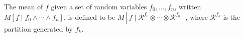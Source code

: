 The mean of $f$ given a set of random variables $f_0, \ldots, f_n$, written $M[f \mid f_0 \wedge \cdots \wedge f_n]$, is defined to be $M[f \mid \mathcal{R}^{f_0} \otimes \cdots \otimes \mathcal{R}^{f_n}]$, where $\mathcal{R}^{f_k}$ is the partition generated by $f_k$.